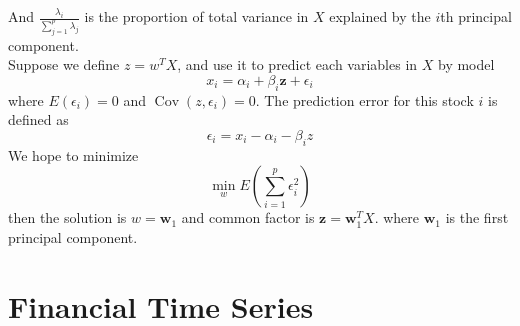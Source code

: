 \documentclass[12pt]{article}
\theoremstyle{definition}
\DeclareMathOperator{\cov}{Cov}
\begin{document}
And $\frac{\lambda_i}{\sum_{j=1}^p \lambda_j}$ is the proportion of total variance in $X$ explained by the $i$th principal component.\\
Suppose we define $z=w^TX$, and use it to predict each variables in $X$ by model
\[
x_i = \alpha_i + \beta_i\mathbf{z} + \epsilon_i
\]
where $E(\epsilon_i) = 0$ and $\cov(z, \epsilon_i) = 0$. The prediction error for this stock $i$ is defined as
\[
\epsilon_i = x_i - \alpha_i -\beta_iz
\]
We hope to minimize
\[
\min_w E(\sum_{i=1}^p\epsilon_i^2)
\]
then the solution is $w=\mathbf{w}_1$ and common factor is $\mathbf{z}=\mathbf{w}_1^TX$. where $\mathbf{w}_1$ is the first principal component.
\clearpage
\section{Financial Time Series}
\end{document}
